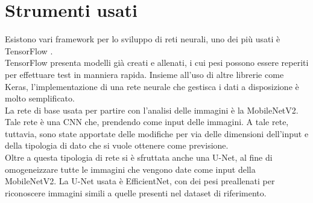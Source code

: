\section{Strumenti usati}
Esistono vari framework per lo sviluppo di reti neurali, uno dei più usati è TensorFlow \cite{tsf}. 
\\
TensorFlow presenta modelli già creati e allenati, i cui pesi possono essere reperiti per effettuare test in manniera rapida.
Insieme all'uso di altre librerie come Keras, l'implementazione di una rete neurale che gestisca i dati a disposizione 
è molto semplificato.
\\
La rete di base usata per partire con l'analisi delle immagini è la MobileNetV2. Tale rete è una CNN che, prendendo come input delle 
immagini.
A tale rete, tuttavia, sono state apportate delle modifiche per via delle dimensioni dell'input e della tipologia di dato 
che si vuole ottenere come previsione.
\\
Oltre a questa tipologia di rete si è sfruttata anche una U-Net, al fine di omogeneizzare tutte le immagini che vengono date come input della MobileNetV2.
La U-Net usata è EfficientNet, con dei pesi preallenati per riconoscere immagini simili a quelle presenti nel dataset di riferimento.

